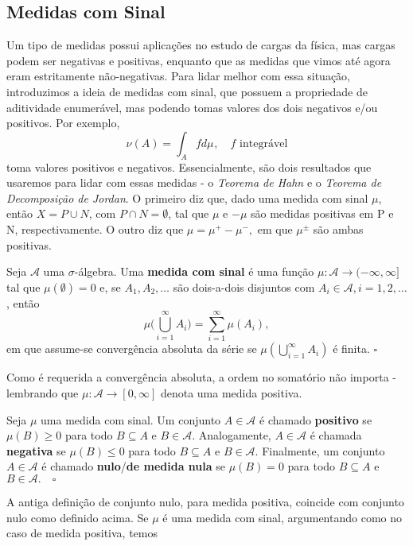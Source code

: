 \documentclass[MeasureTheory/measure_theory.tex]{subfiles}
\begin{document}
\subsection{Medidas com Sinal}
Um tipo de medidas possui aplicações no estudo de cargas da física, mas cargas podem ser negativas e positivas, enquanto que as medidas que vimos até agora eram estritamente não-negativas. Para lidar melhor com essa situação, introduzimos a ideia de medidas
com sinal, que possuem a propriedade de aditividade enumerável, mas podendo tomas valores dos dois negativos e/ou positivos. Por exemplo,
\[
	\nu(A) = \int_{A}f d\mu_{},\quad f \text{ integrável}
\]
toma valores positivos e negativos. Essencialmente, são dois resultados que usaremos para lidar com essas medidas - o \textit{Teorema de Hahn} e o \textit{Teorema de Decomposição de Jordan}. O primeiro diz que,
dado uma medida com sinal \(\mu \), então \(X = P\cup N\), com \(P\cap N = \emptyset \), tal que \(\mu \) e \(-\mu \) são medidas positivas em P e N, respectivamente. O outro diz que \(\mu  = \mu ^{+} - \mu ^{-},\) em que \(\mu ^{\pm}\) são ambas positivas.
\begin{def*}
	Seja \(\mathcal{A}\) uma \(\sigma \)-álgebra. Uma \textbf{medida com sinal} é uma função \(\mu : \mathcal{A}\rightarrow (-\infty, \infty]\) tal que \(\mu (\emptyset ) = 0\) e, se \(A_{1}, A_2, \dotsc \) são dois-a-dois disjuntos com \(A_{i}\in \mathcal{A}, i = 1, 2, \dotsc \), então
	\[
		\mu \biggl(\bigcup_{i=1}^{\infty}A_{i}\biggr) = \sum\limits_{i=1}^{\infty}\mu (A_{i}),
	\]
	em que assume-se convergência absoluta da série se \(\mu (\bigcup_{i=1}^{\infty}A_{i})\) é finita. \(\square\)
\end{def*}
Como é requerida a convergência absoluta, a ordem no somatório não importa - lembrando que \(\mu :\mathcal{A}\rightarrow [0, \infty]\) denota uma medida positiva.
\begin{def*}
	Seja \(\mu \) uma medida com sinal. Um conjunto \(A\in \mathcal{A}\) é chamado \textbf{positivo} se \(\mu (B) \geq 0\) para todo \(B\subseteq A\) e \(B\in \mathcal{A}.\) Analogamente, \(A\in \mathcal{A}\) é chamada \textbf{negativa} se \(\mu (B)\leq 0\) para
	todo \(B\subseteq A\) e \(B\in \mathcal{A}.\) Finalmente, um conjunto \(A\in \mathcal{A}\) é chamado \textbf{nulo}/\textbf{de medida nula} se \(\mu (B) = 0 \) para todo \(B\subseteq A\) e \(B\in \mathcal{A}.\quad \square\)
\end{def*}
A antiga definição de conjunto nulo, para medida positiva, coincide com conjunto nulo como definido acima. Se \(\mu \) é uma medida com sinal, argumentando como no caso de medida positiva, temos
\end{document}
